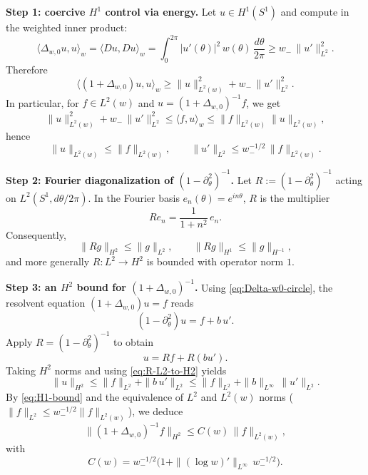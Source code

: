 \documentclass{amsart}
\numberwithin{equation}{section}
\theoremstyle{definition}
\theoremstyle{remark}
\begin{document}
\medskip
\noindent\textbf{Step 1: coercive $H^1$ control via energy.}
Let $u\in H^1(S^1)$ and compute in the weighted inner product:
\[
\langle \Delta_{w,0}u,u\rangle_w = \langle Du,Du\rangle_w
= \int_0^{2\pi} |u'(\theta)|^2\,w(\theta)\,\frac{d\theta}{2\pi}
\ge w_-\,\|u'\|_{L^2}^2.
\]
Therefore
\begin{equation}\label{eq:coercive-H1}
\langle (1+\Delta_{w,0})u,u\rangle_w
\ge \|u\|_{L^2(w)}^2 + w_-\,\|u'\|_{L^2}^2.
\end{equation}
In particular, for $f\in L^2(w)$ and $u=(1+\Delta_{w,0})^{-1}f$, we get
\[
\|u\|_{L^2(w)}^2 + w_-\,\|u'\|_{L^2}^2
\le \langle f,u\rangle_w
\le \|f\|_{L^2(w)}\|u\|_{L^2(w)},
\]
hence
\begin{equation}\label{eq:H1-bound}
\|u\|_{L^2(w)}\le \|f\|_{L^2(w)},\qquad
\|u'\|_{L^2}\le w_-^{-1/2}\,\|f\|_{L^2(w)}.
\end{equation}

\medskip
\noindent\textbf{Step 2: Fourier diagonalization of $(1-\partial_\theta^2)^{-1}$.}
Let $R:=(1-\partial_\theta^2)^{-1}$ acting on $L^2(S^1,d\theta/2\pi)$.
In the Fourier basis $e_n(\theta)=e^{in\theta}$, $R$ is the multiplier
\[
Re_n = \frac{1}{1+n^2}\,e_n.
\]
Consequently,
\begin{equation}\label{eq:R-L2-to-H2}
\|Rg\|_{H^2}\le \|g\|_{L^2},
\qquad
\|Rg\|_{H^1}\le \|g\|_{H^{-1}},
\end{equation}
and more generally $R:L^2\to H^2$ is bounded with operator norm $1$.

\medskip
\noindent\textbf{Step 3: an $H^2$ bound for $(1+\Delta_{w,0})^{-1}$.}
Using \eqref{eq:Delta-w0-circle}, the resolvent equation $(1+\Delta_{w,0})u=f$ reads
\begin{equation}\label{eq:resolvent-eq}
(1-\partial_\theta^2)u = f + b\,u'.
\end{equation}
Apply $R=(1-\partial_\theta^2)^{-1}$ to obtain
\[
u = Rf + R(bu').
\]
Taking $H^2$ norms and using \eqref{eq:R-L2-to-H2} yields
\begin{equation}\label{eq:H2-bound-pre}
\|u\|_{H^2}
\le \|f\|_{L^2} + \|b\,u'\|_{L^2}
\le \|f\|_{L^2} + \|b\|_{L^\infty}\,\|u'\|_{L^2}.
\end{equation}
By \eqref{eq:H1-bound} and the equivalence of $L^2$ and $L^2(w)$ norms
($\|f\|_{L^2}\le w_-^{-1/2}\|f\|_{L^2(w)}$), we deduce
\begin{equation}\label{eq:H2-bound}
\|(1+\Delta_{w,0})^{-1}f\|_{H^2}
\le C(w)\,\|f\|_{L^2(w)},
\end{equation}
with
\[
C(w)=w_-^{-1/2}\Big(1+\|(\log w)'\|_{L^\infty}\,w_-^{-1/2}\Big).
\]
\end{document}
